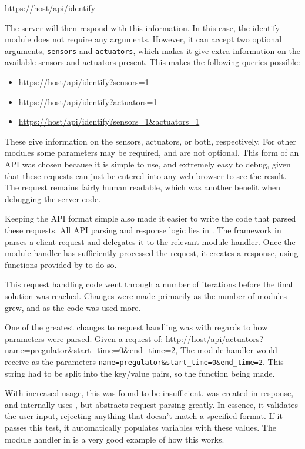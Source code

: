 \url{https://host/api/identify}

The server will then respond with this information. In this case, the identify module does not require any arguments. However, it can accept two optional arguments, \texttt{sensors} and \texttt{actuators}, which makes it give extra information on the available sensors and actuators present. This makes the following queries possible:

\begin{itemize}
	\item \url{https://host/api/identify?sensors=1}
	\item \url{https://host/api/identify?actuators=1}
	\item \url{https://host/api/identify?sensors=1&actuators=1}
\end{itemize}

These give information on the sensors, actuators, or both, respectively. For other modules some parameters may be required, and are not optional.
This form of an API was chosen because it is simple to use, and extremely easy to debug, given that these requests can just be entered into any web browser to see the result. The request remains fairly human readable, which was another benefit when debugging the server code. 

Keeping the API format simple also made it easier to write the code that parsed these requests. All API parsing and response logic lies in . The framework in  parses a client request and delegates it to the relevant module handler. Once the module handler has sufficiently processed the request, it creates a response, using functions provided by  to do so. 

This request handling code went through a number of iterations before the final solution was reached. Changes were made primarily as the number of modules grew, and as the code was used more. 

One of the greatest changes to request handling was with regards to how parameters were parsed. Given a request of: \url{http://host/api/actuators?name=pregulator\&start_time=0\&end_time=2}, The module handler would receive as the parameters \texttt{name=pregulator\&start_time=0\&end_time=2}. This string had to be split into the key/value pairs, so the function  being made.

With increased usage, this was found to be insufficient.  was created in response, and internally uses , but abstracts request parsing greatly. In essence, it validates the user input, rejecting anything that doesn't match a specified format. If it passes this test, it automatically populates variables with these values. The  module handler in  is a very good example of how this works. 

